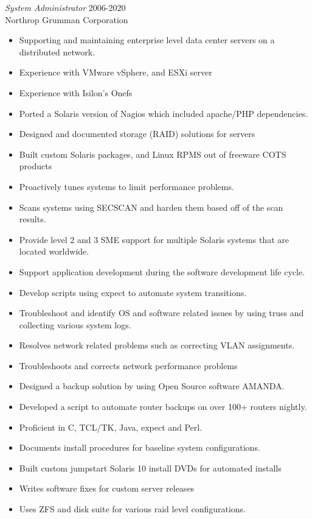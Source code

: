 \documentclass[margin, 10pt]{res} %
\begin{document}
\begin{resume}
{\sl System Administrator } \hfill 2006-2020 \\
Northrop Grumman Corporation
\begin{itemize}
  \item Supporting and maintaining enterprise level data center servers on a distributed network.
  \item Experience with VMware vSphere, and ESXi server
  \item Experience with Isilon’s Onefs
  \item Ported a Solaris version of Nagios which included apache/PHP dependencies.
  \item Designed and documented storage (RAID) solutions for servers
  \item Built custom Solaris packages, and Linux RPMS out of freeware COTS products
  \item Proactively tunes systems to limit performance problems.
  \item Scans systems using SECSCAN and harden them based off of the scan results.
  \item Provide level 2 and 3 SME support for multiple Solaris systems that are located worldwide.
  \item Support application development during the software development life cycle.
  \item Develop scripts using expect to automate system transitions.
  \item Troubleshoot and identify OS and software related issues by using truss and collecting various system logs.
  \item Resolves network related problems such as correcting VLAN assignments.
  \item Troubleshoots and corrects network performance problems
  \item Designed a backup solution by using Open Source software AMANDA.
  \item Developed a script to automate router backups on over 100+ routers nightly.
  \item Proficient in C, TCL/TK, Java, expect and Perl.
  \item Documents install procedures for baseline system configurations.
  \item Built custom jumpstart Solaris 10 install DVDs for automated installs
  \item Writes software fixes for custom server releases
  \item Uses ZFS and disk suite for various raid level configurations.
\end{itemize}


\end{resume}
\end{document}
